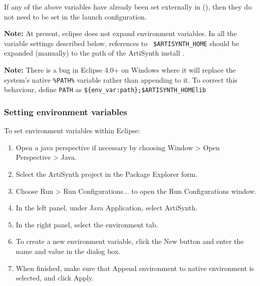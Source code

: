If any of the above variables have already been set externally in
\SYSTEM (\environmentSectionRef), then they do not need to
be set in the launch configuration.

\begin{sideblock}
{\bf Note:} At present, eclipse does not expand environment variables.
In all the variable settings described below, references to {\tt
\$ARTISYNTH\_HOME} should be expanded (manually) to the path of the
ArtiSynth install \directory.
\end{sideblock}

\ifNeedLibraryPath
\ifWindows
\begin{sideblock}
{\bf Note:} There is a bug in Eclipse 4.0+ on Windows where it will replace 
the system's native {\tt \%PATH\%} variable rather than appending to it.  
To correct this behaviour, define {\tt PATH} as 
{\tt \$\{env\_var:path\};\$ARTISYNTH\_HOME\SEP lib\SEP \ARCH} 
\end{sideblock}
\fi
\fi

\subsubsection {Setting environment variables}
\label{SettingEnvironmentVariables}

To set environment variables within Eclipse:

\begin{enumerate}

\item Open a java perspective if necessary by choosing
  {\sf Window > Open Perspective > Java}.

\item Select the ArtiSynth project in the {\sf Package Explorer} form.

\item Choose {\sf Run > Run Configurations...} to open the {\sf Run
  Configurations} window.

\item In the left panel, under {\sf Java Application}, select {\sf ArtiSynth}.

\item In the right panel, select the {\sf environment} tab.

\item To create a new environment variable, click the {\sf New} button and
  enter the name and value in the dialog box.

\item When finished, make sure that {\sf Append environment to native
  environment} is selected, and click {\sf Apply}.

\end{enumerate}

